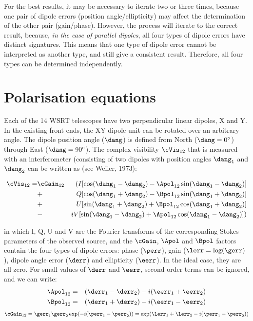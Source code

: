 	For the best results, it may be necessary to iterate two or three
times, because one pair of dipole errors (position angle/ellipticity) may
affect the determination of the other pair (gain/phase).  However, the process
will iterate to the correct result, because, {\em in the case of parallel
dipoles}, all four types of dipole errors have distinct signatures.  This means
that one type of dipole error cannot be interpreted as another type, and still
give a consistent result.  Therefore, all four types can be determined
independently.

\section{Polarisation equations}

	Each of the 14 WSRT telescopes have two perpendicular linear dipoles, X
and Y.  In the existing front-ends, the XY-dipole unit can be rotated over an
arbitrary angle.  The dipole position angle ($\dang$) is defined from North
($\dang=0^\circ$) through East ($\dang=90^\circ$).  The complex visibility
$\cVis_{12}$ that is measured with an interferometer (consisting of two dipoles
with position angles $\dang_1$ and $\dang_2$ can be written as (see Weiler,
1973):

\begin{eqnarray}
\cVis_{12} =& \cGain_{12} &( I[\cos(\dang_1-\dang_2) -
				  \Apol_{12}\sin(\dang_1-\dang_2)] \nonumber \\
	    &  + &           Q[\cos(\dang_1+\dang_2) -
				  \Bpol_{12}\sin(\dang_1+\dang_2)] \nonumber \\
	    &  + &           U[\sin(\dang_1+\dang_2) +
				  \Bpol_{12}\cos(\dang_1+\dang_2)] \nonumber \\
	    &  - &          iV[\sin(\dang_1-\dang_2) +
				  \Apol_{12}\cos(\dang_1-\dang_2)])
\label{.equ.pol.002}
\end{eqnarray}

in which I, Q, U and V are the Fourier transforms of the corresponding Stokes
parameters of the observed source, and the $\cGain$, $\Apol$ and $\Bpol$
factors contain the four types of dipole errors: phase ($\perr$), gain
($\lerr=\log(\gerr)$), dipole angle error ($\derr$) and ellipticity ($\eerr$).
In the ideal case, they are all zero. For small values of $\derr$ and $\eerr$,
second-order terms can be ignored, and we can write:
%
\begin{eqnarray}
\Apol_{12} &=& (\derr_1 - \derr_2) - i(\eerr_1 + \eerr_2) \nonumber\\
\Bpol_{12} &=& (\derr_1 + \derr_2) - i(\eerr_1 - \eerr_2)
\label{.equ.pol.004}
\end{eqnarray}
%
\begin{eqnarray}
\cGain_{12} = \gerr_1\gerr_2\exp(-i(\perr_1-\perr_2))
	    = \exp(\lerr_1+\lerr_2-i(\perr_1-\perr_2))
\label{.equ.pol.006}
\end{eqnarray}


